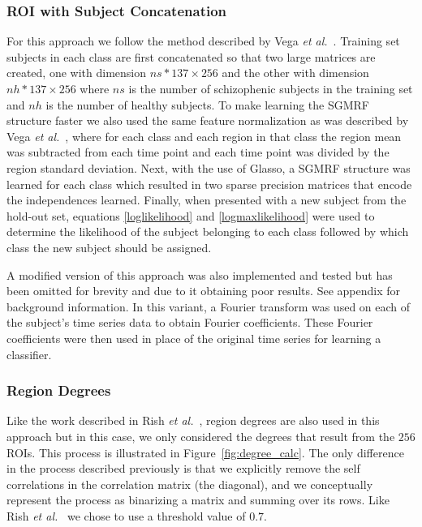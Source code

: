 \documentclass{article} %
\begin{document}
\subsubsection{ROI with Subject Concatenation}

For this approach we follow the method described by Vega \emph{et al.}~\cite{rvega}.
Training set subjects in each class are first concatenated so that two large 
matrices are created, one with dimension $ns * 137 \times 256$ and the other 
with dimension $nh * 137 \times 256$ where $ns$ is the number of schizophenic 
subjects in the training set and $nh$ is the number of healthy subjects. To
make learning the SGMRF structure faster we also used the same feature 
normalization as was described by Vega \emph{et al.}~\cite{rvega},
where for each class and each region in that class the region mean was 
subtracted from each time point and each time point was divided by the 
region standard deviation. Next, with the use of Glasso, a SGMRF structure was 
learned for each class which resulted in two sparse precision matrices that 
encode the independences learned. Finally, when presented with a new subject 
from the hold-out set, equations \eqref{loglikelihood} and 
\eqref{logmaxlikelihood} were used to determine the likelihood of the subject 
belonging to each class followed by which class the new subject should be 
assigned.

A modified version of this approach was also implemented and tested but has
been omitted for brevity and due to it obtaining poor results. See appendix
for background information. In this variant,
a Fourier transform was used on each of the subject's time series data to 
obtain Fourier coefficients. These Fourier coefficients were then used in 
place of the original time series for learning a classifier.


\subsubsection{Region Degrees}

Like the work described in Rish \emph{et al.}~\cite{rish2009discriminative}, 
region degrees are also used in this approach but in this case, we only 
considered the degrees that result from the $256$ ROIs. This process is 
illustrated in Figure~\ref{fig:degree_calc}. The only difference in the
process described previously is that we explicitly remove the self 
correlations in the correlation matrix (the diagonal), and we conceptually
represent the process as binarizing a matrix and summing over its rows.
Like Rish \emph{et al.}~\cite{rish2009discriminative} we chose to use a 
threshold value of $0.7$. 
\end{document}
